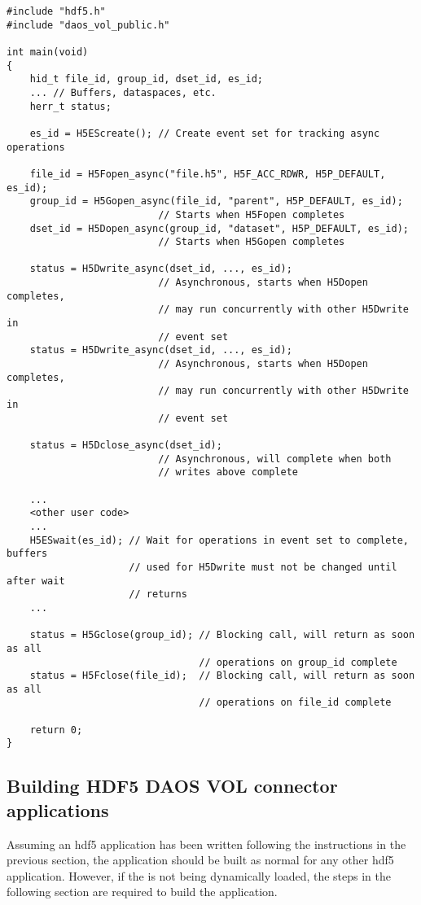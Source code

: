 \documentclass[../users_guide.tex]{subfiles}
\begin{document}
\begin{verbatim}
#include "hdf5.h"
#include "daos_vol_public.h"

int main(void)
{
    hid_t file_id, group_id, dset_id, es_id;
    ... // Buffers, dataspaces, etc.
    herr_t status;

    es_id = H5EScreate(); // Create event set for tracking async operations

    file_id = H5Fopen_async("file.h5", H5F_ACC_RDWR, H5P_DEFAULT, es_id);
    group_id = H5Gopen_async(file_id, "parent", H5P_DEFAULT, es_id);
                          // Starts when H5Fopen completes
    dset_id = H5Dopen_async(group_id, "dataset", H5P_DEFAULT, es_id);
                          // Starts when H5Gopen completes

    status = H5Dwrite_async(dset_id, ..., es_id); 
                          // Asynchronous, starts when H5Dopen completes,
                          // may run concurrently with other H5Dwrite in
                          // event set
    status = H5Dwrite_async(dset_id, ..., es_id);
                          // Asynchronous, starts when H5Dopen completes,
                          // may run concurrently with other H5Dwrite in
                          // event set

    status = H5Dclose_async(dset_id);
                          // Asynchronous, will complete when both
                          // writes above complete

    ...
    <other user code>
    ...
    H5ESwait(es_id); // Wait for operations in event set to complete, buffers
                     // used for H5Dwrite must not be changed until after wait
                     // returns
    ...

    status = H5Gclose(group_id); // Blocking call, will return as soon as all
                                 // operations on group_id complete
    status = H5Fclose(file_id);  // Blocking call, will return as soon as all
                                 // operations on file_id complete

    return 0;
}
\end{verbatim}

\subsection{Building HDF5 DAOS VOL connector applications}

Assuming an \acrshort{hdf5} application has been written following the instructions in the previous section, the application should be built as normal for any other
\acrshort{hdf5} application. However,
if the \dvc{} is not being dynamically loaded, the steps in the following
section are required to build the application.
\end{document}
